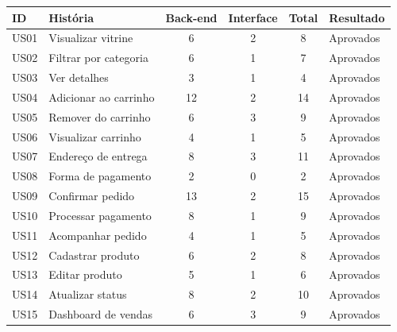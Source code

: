 \begin{longtable}{|p{1.2cm}|p{4.6cm}|c|c|c|p{2.8cm}|}
\hline
\rowcolor{gray!30} \textbf{ID} & \textbf{História} & \textbf{Back-end} & \textbf{Interface} & \textbf{Total} & \textbf{Resultado} \\ \hline
\endhead
US01 & Visualizar vitrine & 6 & 2 & 8 & Aprovados \\ \hline
US02 & Filtrar por categoria & 6 & 1 & 7 & Aprovados \\ \hline
US03 & Ver detalhes & 3 & 1 & 4 & Aprovados \\ \hline
US04 & Adicionar ao carrinho & 12 & 2 & 14 & Aprovados \\ \hline
US05 & Remover do carrinho & 6 & 3 & 9 & Aprovados \\ \hline
US06 & Visualizar carrinho & 4 & 1 & 5 & Aprovados \\ \hline
US07 & Endereço de entrega & 8 & 3 & 11 & Aprovados \\ \hline
US08 & Forma de pagamento & 2 & 0 & 2 & Aprovados \\ \hline
US09 & Confirmar pedido & 13 & 2 & 15 & Aprovados \\ \hline
US10 & Processar pagamento & 8 & 1 & 9 & Aprovados \\ \hline
US11 & Acompanhar pedido & 4 & 1 & 5 & Aprovados \\ \hline
US12 & Cadastrar produto & 6 & 2 & 8 & Aprovados \\ \hline
US13 & Editar produto & 5 & 1 & 6 & Aprovados \\ \hline
US14 & Atualizar status & 8 & 2 & 10 & Aprovados \\ \hline
US15 & Dashboard de vendas & 6 & 3 & 9 & Aprovados \\ \hline
\end{longtable}